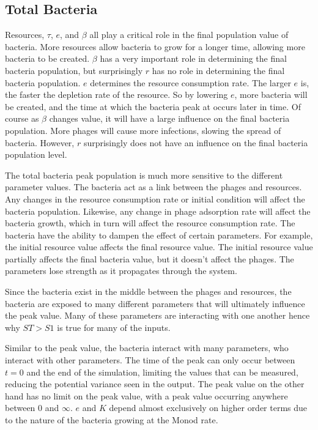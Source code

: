 \subsection{Total Bacteria}
Resources, $\tau$, $e$, and $\beta$ all play a critical role in the final population value of bacteria. 
More resources allow bacteria to grow for a longer time, allowing more bacteria to be created. 
$\beta$ has a very important role in determining the final bacteria population, but surprisingly $r$ has no role in determining the final bacteria population. 
$e$ determines the resource consumption rate. 
The larger $e$ is, the faster the depletion rate of the resource. 
So by lowering $e$, more bacteria will be created, and the time at which the bacteria peak at occurs later in time. 
Of course as $\beta$ changes value, it will have a large influence on the final bacteria population. 
More phages will cause more infections, slowing the spread of bacteria. 
However, $r$ surprisingly does not have an influence on the final bacteria population level.  

The total bacteria peak population is much more sensitive to the different parameter values. 
The bacteria act as a link between the phages and resources. Any changes in the resource consumption rate or initial condition will affect the bacteria population. 
Likewise, any change in phage adsorption rate will affect the bacteria growth, which in turn will affect the resource consumption rate. 
The bacteria have the ability to dampen the effect of certain parameters. 
For example, the initial resource value affects the final resource value. 
The initial resource value partially affects the final bacteria value, but it doesn't affect the phages. 
The parameters lose strength as it propagates through the system. 

Since the bacteria exist in the middle between the phages and resources, the bacteria are exposed to many different parameters that will ultimately influence the peak value. 
Many of these parameters are interacting with one another hence why $ST > S1$ is true for many of the inputs. 

Similar to the peak value, the bacteria interact with many parameters, who interact with other parameters. 
The time of the peak can only occur between $t=0$ and the end of the simulation, limiting the values that can be measured, reducing the potential variance seen in the output. 
The peak value on the other hand has no limit on the peak value, with a peak value occurring anywhere between 0 and $\infty$. 
$e$ and $K$ depend almost exclusively on higher order terms due to the nature of the bacteria growing at the Monod rate. 

